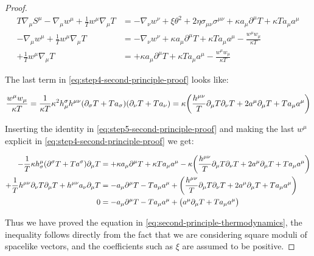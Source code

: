 \documentclass[main.tex]{subfiles}
\begin{document}
\begin{proof}
    \begin{subequations}
    \begin{align}
      T\nabla_\mu S^\mu - \nabla_\mu w^\mu + \frac{1}{T} w^\mu \nabla_\mu T &=
      - \nabla_\nu w^\nu
      + \xi \theta^2 + 2 \eta \sigma_{\mu\nu} \sigma^{\mu\nu}
      + \kappa a_\mu \partial^\mu T + \kappa T a_\mu a^\mu
      \label{eq:step-second-principle-proof-before-subtraction} \\
      - \nabla_\mu w^\mu + \frac{1}{T} w^\mu \nabla_\mu T &=
      - \nabla_\nu w^\nu
      + \kappa a_\mu \partial^\mu T + \kappa T a_\mu a^\mu
      - \frac{w^\mu w_\mu}{\kappa T} \label{eq:step-second-principle-proof-after-subtraction} \\
      + \frac{1}{T} w^\mu \nabla_\mu T &=
      + \kappa a_\mu \partial^\mu T + \kappa T a_\mu a^\mu
      - \frac{w^\mu w_\mu}{\kappa T} \label{eq:step4-second-principle-proof}
    \end{align}
    \end{subequations}

    The last term in \eqref{eq:step4-second-principle-proof} looks like:

    \begin{equation} \label{eq:step5-second-principle-proof}
        \frac{w^\mu w_\mu}{\kappa T} = \frac{1}{\kappa T }
        \kappa^2 h^\sigma _\mu h^{\mu\nu} \qty(\partial_\sigma T + T a_\sigma) \qty(\partial_\nu T + T a_\nu)
        = \kappa \qty(\frac{h^{\mu\nu}}{T} \partial_\mu T \partial_\nu T + 2 a^\mu \partial_\mu T + T a_\mu a^\mu)
    \end{equation}

    Inserting the identity in \eqref{eq:step5-second-principle-proof}  and making the last \(w^\mu\) explicit in \eqref{eq:step4-second-principle-proof} we get:

    \begin{subequations}
    \begin{align}
      -\frac{1}{T} \kappa h^\mu _\sigma  \qty(\partial^\sigma T + T a^\sigma) \partial_\mu T  &= + \kappa a_\mu \partial^\mu T + \kappa T a_\mu a^\mu
      -\kappa \qty(\frac{h^{\mu\nu}}{T} \partial_\mu T \partial_\nu T + 2 a^\mu \partial_\mu T + T a_\mu a^\mu) \\
      +\frac{1}{T} h^{\mu\nu} \partial_\nu T  \partial_\mu T + h^{\mu\nu} a_\nu \partial_\mu T  &= - a_\mu \partial^\mu T -  T a_\mu a^\mu
      + \qty(\frac{h^{\mu\nu}}{T} \partial_\mu T \partial_\nu T + 2 a^\mu \partial_\mu T + T a_\mu a^\mu) \\
      0  &= - a_\mu \partial^\mu T -  T a_\mu a^\mu
      + \qty( a^\mu \partial_\mu T + T a_\mu a^\mu)
    \end{align}
    \end{subequations}

    Thus we have proved the equation in \eqref{eq:second-principle-thermodynamics}, the inequality follows directly from the fact that we are considering square moduli of spacelike vectors, and the coefficients such as \(\xi\) are assumed to be positive.
\end{proof}
\end{document}
